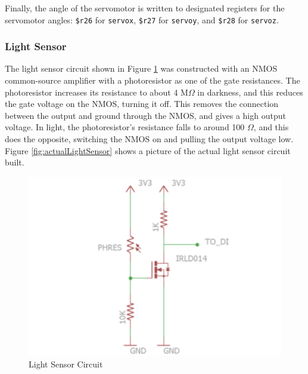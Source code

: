 \documentclass{article}
\begin{document}
        Finally, the angle of the servomotor is written to designated registers for the servomotor angles: {\tt \$r26} for {\tt servox}, {\tt \$r27} for {\tt servoy}, and {\tt \$r28} for {\tt servoz}.
        
    \subsubsection{Light Sensor}
    The light sensor circuit shown in Figure \ref{fig:lightSensor} was constructed with an NMOS common-source amplifier with a photoresistor as one of the gate resistances. The photoresistor increases its resistance to about 4 M$\Omega$ in darkness, and this reduces the gate voltage on the NMOS, turning it off. This removes the connection between the output and ground through the NMOS, and gives a high output voltage. In light, the photoresistor's resistance falls to around 100 $\Omega$, and this does the opposite, switching the NMOS on and pulling the output voltage low. Figure \ref{fig:actualLightSensor} shows a picture of the actual light sensor circuit built.
        
        \begin{figure}[H]
            \begin{center}
                \includegraphics[scale=0.8]{lightSensor.PNG}
                \caption{Light Sensor Circuit}
                \label{fig:lightSensor}
            \end{center}
        \end{figure}
        
\end{document}
